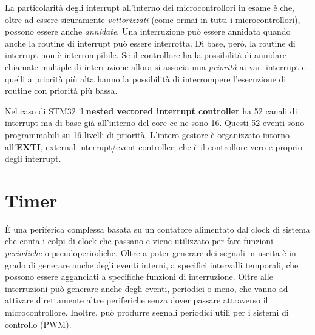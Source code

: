 \documentclass[12pt, a4paper]{report}
\begin{document}
La particolarità degli interrupt all'interno dei microcontrollori in esame è che, oltre ad essere sicuramente \textit{vettorizzati} (come ormai in tutti i microcontrollori), possono essere anche \textit{annidate}. Una interruzione può essere annidata quando anche la routine di interrupt può essere interrotta. Di base, però, la routine di interrupt non è interrompibile. Se il controllore ha la possibilità di annidare chiamate multiple di interruzione allora si associa una \textit{priorità} ai vari interrupt e quelli a priorità più alta hanno la possibilità di interrompere l'esecuzione di routine con priorità più bassa.

Nel caso di STM32 il \textbf{nested vectored interrupt controller} ha 52 canali di interrupt ma di base già all'interno del core ce ne sono 16. Questi 52 eventi sono programmabili su 16 livelli di priorità. L'intero gestore è organizzato intorno all'\textbf{EXTI}, external interrupt/event controller, che è il controllore vero e proprio degli interrupt.

\section{Timer}
È una periferica complessa basata su un contatore alimentato dal clock di sistema che conta i colpi di clock che passano e viene utilizzato per fare funzioni \textit{periodiche} o pseudoperiodiche. Oltre a poter generare dei segnali in uscita è in grado di generare anche degli eventi interni, a specifici intervalli temporali, che possono essere agganciati a specifiche funzioni di interruzione. Oltre alle interruzioni può generare anche degli eventi, periodici o meno, che vanno ad attivare direttamente altre periferiche senza dover passare attraverso il microcontrollore. Inoltre, può produrre segnali periodici utili per i sistemi di controllo (PWM).
\end{document}
